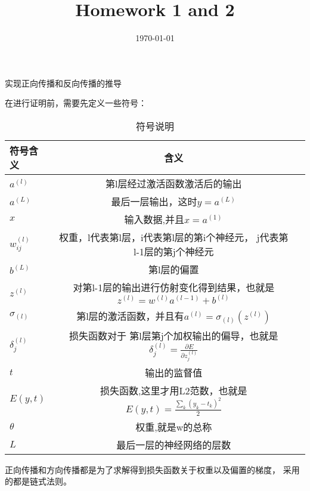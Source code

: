 \documentclass{homework}
\date{\today}
\title{ Homework 1 and 2 }
\begin{document}
 \maketitle

\question 实现正向传播和反向传播的推导


在进行证明前，需要先定义一些符号：
\begin{table}[htbp]
	\centering 
	\caption{\label{tab:test}符号说明}
	\begin{tabular}{lcr}
		\toprule
		符号含义 & 含义  \\
		\midrule
		$a^{(l)}$ & 第l层经过激活函数激活后的输出 \\

		$a^{(L)}$ & 最后一层输出，这时$y=a^{(L)}$ \\
		$x$ & 输入数据,并且$x=a^{(1)}$ \\
		$w_{ij}^{(l)}$ & 权重，l代表第l层，i代表第l层的第i个神经元，
		j代表第l-1层的第j个神经元 \\
		$b^{(L)}$ & 第l层的偏置 \\
		$z^{(l)}$ & 对第l-1层的输出进行仿射变化得到结果，也就是
		$z^{(l)} =w^{(l)}a^{(l-1)} +b^{(l)} $\\
		$\sigma_{(l)}$ & 第l层的激活函数，并且有$a^{(l)} = 
		\sigma_{(l)}(z^{(l)})$\\
		$\delta^{(l)}_j$ & 损失函数对于
		第l层第j个加权输出的偏导，也就是$\delta^{(l)}_j= 
		\frac{\partial E}{\partial z^{(l)}_j}$\\
		$t$ & 输出的监督值 \\
		$E(y,t)$ & 损失函数,这里才用L2范数，也就是$E(y,t) = 
		\frac{\sum_k(y_k-t_k)^2}{2}$ \\
		$\theta$ & 权重,就是w的总称 \\
		$L$ & 最后一层的神经网络的层数 \\
		\bottomrule
	\end{tabular}
\end{table}

正向传播和方向传播都是为了求解得到损失函数关于权重以及偏置的梯度，
采用的都是链式法则。
\iffalse
\noindent Rather than finding the shortest path between two points, suppose our car is low on gas, so we want to take the path that uses the least fuel. In the real world, navigation optimized for fuel consumption may take more steps to reach a destination \footnote{\href{https://blog.google/products/maps/3-new-ways-navigate-more-sustainably-maps/}{Google Maps Blog}}. 

Consider the same MDP, but with two new ``efficient actions'' -- move right or move down. For example, starting from state 3, you can either move to state 4 or 9. Once again, the actions are deterministic and always succeed unless you run into a wall. Attempting to move in the direction of a wall from a gray square using an efficient action results in you moving \textit{down} one square. For clarity, we will use separate symbols $r_s$ for the reward associated with an inefficient action (right $\&$ up, or  right $\&$ down) and $r_e$ for the reward associated with an efficient action.
\fi 
\end{document}
